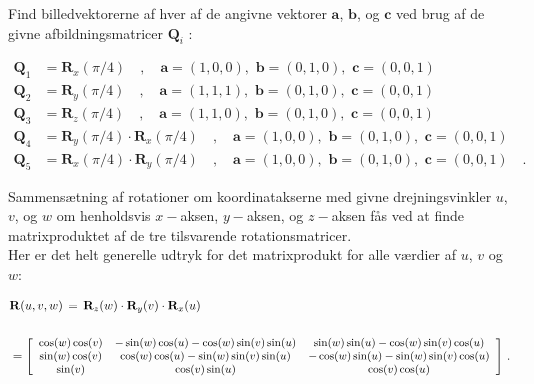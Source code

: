 \begin{exercise}
Find billedvektorerne af hver af de angivne vektorer $\mathbf{a}$, $\mathbf{b}$, og $\mathbf{c}$ ved brug af de givne afbildningsmatricer $\mathbf{Q}_{i}\,\,$:

\begin{equation}
\begin{aligned}
\mathbf{Q}_{1} &= \mathbf{R}_{x}(\pi/4)\quad  , \quad \mathbf{a} = (1,0,0) , \,\, \mathbf{b}= (0,1,0), \,\, \mathbf{c} = (0,0,1)  \\
\mathbf{Q}_{2} &= \mathbf{R}_{y}(\pi/4)\quad  , \quad \mathbf{a} = (1,1,1) , \,\, \mathbf{b}= (0,1,0), \,\, \mathbf{c} = (0,0,1)\\
\mathbf{Q}_{3} &= \mathbf{R}_{z}(\pi/4)\quad  , \quad \mathbf{a} = (1,1,0), \,\, \mathbf{b}= (0,1,0), \,\,  \mathbf{c} = (0,0,1) \\
\mathbf{Q}_{4} &= \mathbf{R}_{y}(\pi/4) \cdot \mathbf{R}_{x}(\pi/4)\quad  , \quad \mathbf{a} = (1,0,0),  \,\, \mathbf{b}= (0,1,0),  \,\, \mathbf{c} = (0,0,1)  \\
\mathbf{Q}_{5} &= \mathbf{R}_{x}(\pi/4) \cdot \mathbf{R}_{y}(\pi/4)\quad  , \quad \mathbf{a} = (1,0,0),  \,\, \mathbf{b}= (0,1,0),  \,\, \mathbf{c} = (0,0,1)  \quad .
\end{aligned}
\end{equation}
\end{exercise}

Sammensætning af rotationer om koordinatakserne med givne drejningsvinkler $u$, $v$, og $w$ om henholdsvis $x-$aksen, $y-$aksen, og $z-$aksen fås ved at finde matrixproduktet af de tre tilsvarende rotationsmatricer.\\

Her er det helt generelle udtryk for det matrixprodukt for alle værdier af $u$, $v$ og $w$:

\begin{equation*} \label{eqRzRyRx}
\begin{aligned}
&\mathbf{R}(u,v,w) \,= \, \mathbf{R}_{z}(w)\cdot \mathbf{R}_{y}(v)\cdot \mathbf{R}_{x}(u) \\ \\
&= \small{\left[
                        \begin{array}{ccc}
                          \cos(w)\cos(v) & -\sin(w)\cos(u) - \cos(w)\sin(v)\sin(u) & \sin(w)\sin(u) - \cos(w)\sin(v)\cos(u) \\
                          \sin(w)\cos(v) & \cos(w)\cos(u) - \sin(w)\sin(v)\sin(u) & -\cos(w)\sin(u) - \sin(w)\sin(v) \cos(u) \\
                          \sin(v) & \cos(v)\sin(u) & \cos(v)\cos(u) \\
                        \end{array}
                      \right]\,.}
\end{aligned}
\end{equation*}

